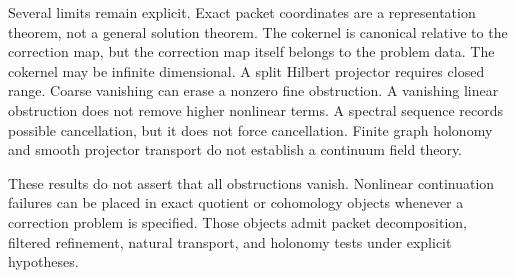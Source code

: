 \documentclass{aomart}
\theoremstyle{definition}
\theoremstyle{remark}
\begin{document}
Several limits remain explicit.  Exact packet coordinates are a representation theorem, not a general solution theorem.  The cokernel is canonical relative to the correction map, but the correction map itself belongs to the problem data.  The cokernel may be infinite dimensional.  A split Hilbert projector requires closed range.  Coarse vanishing can erase a nonzero fine obstruction.  A vanishing linear obstruction does not remove higher nonlinear terms.  A spectral sequence records possible cancellation, but it does not force cancellation.  Finite graph holonomy and smooth projector transport do not establish a continuum field theory.

These results do not assert that all obstructions vanish.  Nonlinear continuation failures can be placed in exact quotient or cohomology objects whenever a correction problem is specified.  Those objects admit packet decomposition, filtered refinement, natural transport, and holonomy tests under explicit hypotheses.




\end{document}
